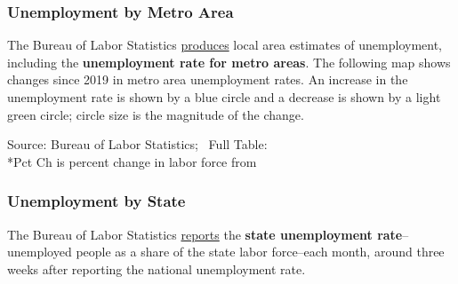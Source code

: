 \subsubsection*{Unemployment by Metro Area}
\begin{minipage}{0.76\textwidth} 
\vspace{-1mm}

\small The Bureau of Labor Statistics \href{https://www.bls.gov/lau/}{produces} local area estimates of unemployment, including the \textbf{unemployment rate for metro areas}. The following map shows changes since 2019 in metro area unemployment rates. An increase in the unemployment rate is shown by a blue circle and a decrease is shown by a light green circle; circle size is the magnitude of the change. 


\end{minipage}
\vspace{1mm}

\begin{minipage}{0.82\textwidth}
\vspace{-3mm}

\hspace*{-8mm} 
\vspace{-3mm}

\footnotesize{Source: Bureau of Labor Statistics; \ Full Table:  \\ \**Pct Ch is percent change in labor force from }
\end{minipage}
\newpage
\subsubsection*{Unemployment by State}
\vspace*{-0.5mm}

\begin{minipage}{0.76\textwidth} 
\small The Bureau of Labor Statistics \href{https://www.bls.gov/lau/}{reports} the \textbf{state unemployment rate}--unemployed people as a share of the state labor force--each month, around three weeks after reporting the national unemployment rate. 
\end{minipage}

\\
\vspace{-2.5mm}
\hspace{-8mm}  \\
\vspace{-3mm}

